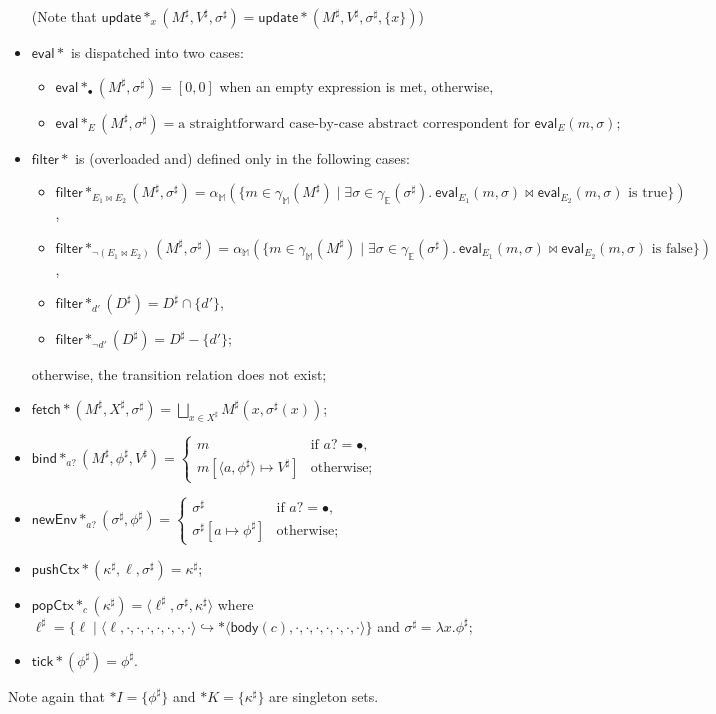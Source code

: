 \documentclass[a4paper]{article}
\newcommand*{\dom}[1]{\mathbb{#1}}
\newcommand*{\state}[8]{\langle #1, #2, #3, #4, #5, #6, #7, #8 \rangle}
\newcommand*{\body}{\mathsf{body}}
\newcommand*{\tarrow}{\hookrightarrow}
\newcommand*{\update}{\mathsf{update}}
\newcommand*{\eval}{\mathsf{eval}}
\newcommand*{\fetch}{\mathsf{fetch}}
\newcommand*{\filter}{\mathsf{filter}}
\newcommand*{\bind}{\mathsf{bind}}
\newcommand*{\newEnv}{\mathsf{newEnv}}
\newcommand*{\pushCtx}{\mathsf{pushCtx}}
\newcommand*{\popCtx}{\mathsf{popCtx}}
\newcommand*{\tick}{\mathsf{tick}}
\newcommand*{\Abstract}[1]{\alpha_{\dom{#1}}}
\newcommand*{\Concrete}[1]{\gamma_{\dom{#1}}}
\begin{document}
\begin{itemize}
  (Note that $\update*_x(M^\sharp, V^\sharp, \sigma^\sharp) = \update*(M^\sharp, V^\sharp, \sigma^\sharp, \{x\})$)
\item $\eval*$ is dispatched into two cases:
  \begin{itemize}
  \item $\eval*_{\bullet}(M^\sharp, \sigma^\sharp) = [0, 0]$ when an empty expression is met, otherwise,
  \item $\eval*_E(M^\sharp, \sigma^\sharp) = \text{a straightforward case-by-case abstract correspondent for $\eval_E(m, \sigma)$;}$
  \end{itemize}
\item $\filter*$ is (overloaded and) defined only in the following cases:
  \begin{itemize}
  \item $\filter*_{E_1 \bowtie E_2}(M^\sharp, \sigma^\sharp) = \Abstract M(\{m \in \Concrete M(M^\sharp) \mid \exists \sigma \in \Concrete E(\sigma^\sharp).\ \text{$\eval_{E_1}(m, \sigma) \bowtie \eval_{E_2}(m, \sigma)$ is true}\})$,
  \item $\filter*_{\neg(E_1 \bowtie E_2)}(M^\sharp, \sigma^\sharp) = \Abstract M(\{m \in \Concrete M(M^\sharp) \mid \exists \sigma \in \Concrete E(\sigma^\sharp).\ \text{$\eval_{E_1}(m, \sigma) \bowtie \eval_{E_2}(m, \sigma)$ is false}\})$,
  \item $\filter*_{d'}(D^\sharp) = D^\sharp \cap \{d'\}$,
  \item $\filter*_{\neg d'}(D^\sharp) = D^\sharp - \{d'\}$;
  \end{itemize}
  otherwise, the transition relation does not exist;
\item $\fetch*(M^\sharp, X^\sharp, \sigma^\sharp) = \bigsqcup_{x \in X^\sharp} M^\sharp(x, \sigma^\sharp(x))$;
\item $\bind*_{a?}(M^\sharp, \phi^\sharp, V^\sharp) =
  \begin{cases}
    m &\text{if $a? = \bullet$,}\\
    m[\langle a, \phi^\sharp \rangle \mapsto V^\sharp] &\text{otherwise;}
  \end{cases}$
\item $\newEnv*_{a?}(\sigma^\sharp, \phi^\sharp) =
  \begin{cases}
    \sigma^\sharp &\text{if $a? = \bullet$,}\\
    \sigma^\sharp[a \mapsto \phi^\sharp] &\text{otherwise;}
  \end{cases}$
\item $\pushCtx*(\kappa^\sharp, \ell, \sigma^\sharp) = \kappa^\sharp$;
\item $\popCtx*_c(\kappa^\sharp) = \langle \ell^\sharp, \sigma^\sharp, \kappa^\sharp \rangle$ where $\ell^\sharp = \{\ell \mid \state{\ell}{\cdot}{\cdot}{\cdot}{\cdot}{\cdot}{\cdot}{\cdot} \tarrow* \state{\body(c)}{\cdot}{\cdot}{\cdot}{\cdot}{\cdot}{\cdot}{\cdot}\}$ and $\sigma^\sharp = \lambda x. \phi^\sharp$;
\item $\tick*(\phi^\sharp) = \phi^\sharp$.
\end{itemize}
Note again that $\dom*I = \{\phi^\sharp\}$ and $\dom*K = \{\kappa^\sharp\}$ are singleton sets.
\end{document}
